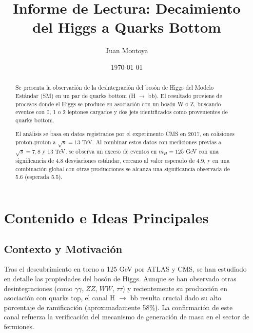 \documentclass[a4paper,11pt]{article}
\title{Informe de Lectura: Decaimiento del Higgs a Quarks Bottom}
\author{Juan Montoya}
\date{\today}
\begin{document}
\maketitle

\begin{abstract}
Se presenta la observación de la desintegración del bosón de Higgs del Modelo Estándar (SM) en un par de quarks bottom (H $\rightarrow$ bb). El resultado proviene de procesos donde el Higgs se produce en asociación con un bosón W o Z, buscando eventos con 0, 1 o 2 leptones cargados y dos jets identificados como provenientes de quarks bottom. 

El análisis se basa en datos registrados por el experimento CMS en 2017, en colisiones proton-proton a $\sqrt{s} = 13$ TeV. Al combinar estos datos con mediciones previas a $\sqrt{s}=7,8$ y 13 TeV, se observa un exceso de eventos en $m_H = 125$ GeV con una significancia de 4.8 desviaciones estándar, cercano al valor esperado de 4.9, y en una combinación global con otras producciones se alcanza una significancia observada de 5.6 (esperada 5.5). 
\end{abstract}


\section{Contenido e Ideas Principales}
\subsection*{Contexto y Motivación}
Tras el descubrimiento en torno a 125 GeV por ATLAS y CMS, se han estudiado en detalle las propiedades del bosón de Higgs. Aunque se han observado otras desintegraciones (como $\gamma\gamma$, $ZZ$, $WW$, $\tau\tau$) y recientemente su producción en asociación con quarks top, el canal H $\rightarrow$ bb resulta crucial dado su alto porcentaje de ramificación (aproximadamente 58\%). La confirmación de este canal refuerza la verificación del mecanismo de generación de masa en el sector de fermiones.
\end{document}
